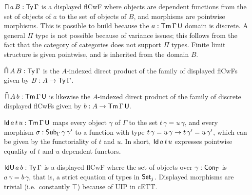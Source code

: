 \documentclass{llncs}
\newcommand{\Pii}{\mathsf{\Pi}}
\newcommand{\Pie}{\mathsf{\hat{\Pi}}}
\newcommand{\Piinf}{\mathsf{\tilde{\Pi}}}
\newcommand{\IdU}{\mathsf{IdU}}
\begin{document}
\begin{nidefinition}
$\Pii\,a\,B : \Ty\,\Gamma$ is a displayed flCwF where objects are dependent
functions from the set of objects of $a$ to the set of objects of $B$, and
morphisms are pointwise morphisms. This is possible to build because the $a :
\mathsf{Tm}\,\Gamma\,\mathsf{U}$ domain is discrete. A general $\Pii$ type is not possible
because of variance issues; this follows from the fact that the category of
categories does not support $\Pii$ types\cite{elephant}. Finite limit structure
is given pointwise, and is inherited from the domain $B$.

$\Pie\,A\,B : \Ty\,\Gamma$ is the $A$-indexed direct product of the family of
displayed flCwFs given by $B : A \rightarrow \mathsf{Ty}\,\Gamma$.

$\Piinf\,A\,b : \Tm\,\Gamma\,\U$ is likewise the $A$-indexed direct product of
the family of discrete displayed flCwFs given by $b : A \rightarrow \mathsf{Tm}\,\Gamma\,\mathsf{U}$.

$\mathsf{Id}\,a\,t\,u : \mathsf{Tm}\,\Gamma\,\mathsf{U}$ maps every object $\gamma$ of $\Gamma$ to the
set $t\,\gamma = u\,\gamma$, and every morphism $\sigma :
\mathsf{Sub}_\Gamma\,\gamma\,\gamma'$ to a function with type $t\,\gamma = u\,\gamma
\rightarrow t\,\gamma' = u\,\gamma'$, which can be given by the functoriality of $t$
and $u$. In short, $\mathsf{Id}\,a\,t\,u$ expresses pointwise equality of $t$ and $u$
dependent functors.

$\IdU\,a\,b : \Ty\,\Gamma$ is a displayed flCwF where the set of objects over
$\gamma : \mathsf{Con}_\Gamma$ is $a\,\gamma = b\,\gamma$, that is, a strict equation
of types in $\mathsf{Set}_j$. Displayed morphisms are trivial (i.e.\ constantly
$\top$) because of UIP in cETT.



\end{nidefinition}
\end{document}
